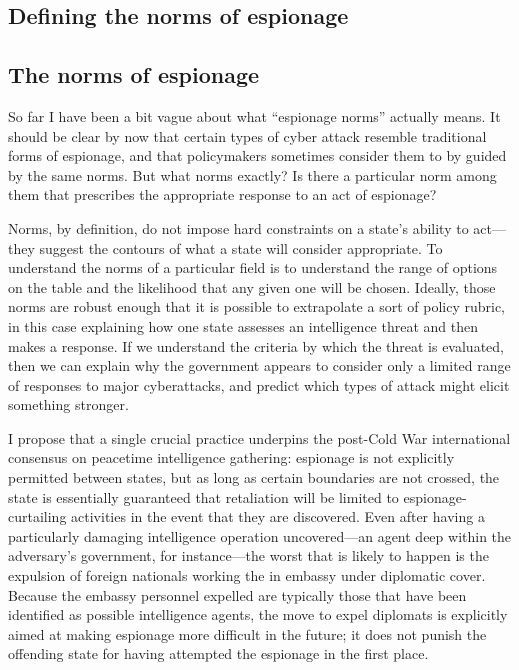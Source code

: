 \documentclass{memoir}
\begin{document}
\begin{refsegment}

\section{Defining the norms of espionage}
\subsection{The norms of espionage}
So far I have been a bit vague about what ``espionage norms'' actually means. It should be clear by now that certain types of cyber attack resemble traditional forms of espionage, and that policymakers sometimes consider them to by guided by the same norms. But what norms exactly? Is there a particular norm among them that prescribes the appropriate response to an act of espionage?

Norms, by definition, do not impose hard constraints on a state's ability to act---they suggest the contours of what a state will consider appropriate. To understand the norms of a particular field is to understand the range of options on the table and the likelihood that any given one will be chosen. Ideally, those norms are robust enough that it is possible to extrapolate a sort of policy rubric, in this case explaining how one state assesses an intelligence threat and then makes a response. If we understand the criteria by which the threat is evaluated, then we can explain why the government appears to consider only a limited range of responses to major cyberattacks, and predict which types of attack might elicit something stronger.

I propose that a single crucial practice underpins the post-Cold War international consensus on peacetime intelligence gathering: espionage is not explicitly permitted between states, but as long as certain boundaries are not crossed, the state is essentially guaranteed that retaliation will be limited to espionage-curtailing activities in the event that they are discovered. Even after having a particularly damaging intelligence operation uncovered---an agent deep within the adversary's government, for instance---the worst that is likely to happen is the expulsion of foreign nationals working the in embassy under diplomatic cover. Because the embassy personnel expelled are typically those that have been identified as possible intelligence agents, the move to expel diplomats is explicitly aimed at making espionage more difficult in the future; it does not punish the offending state for having attempted the espionage in the first place.


\end{refsegment}
\end{document}
